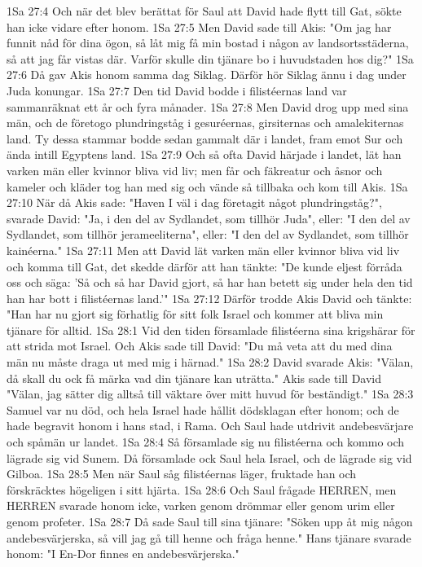 1Sa 27:4  Och när det blev berättat för Saul att David hade flytt till Gat, sökte han icke vidare efter honom.
1Sa 27:5  Men David sade till Akis: "Om jag har funnit nåd för dina ögon, så låt mig få min bostad i någon av landsortsstäderna, så att jag får vistas där. Varför skulle din tjänare bo i huvudstaden hos dig?"
1Sa 27:6  Då gav Akis honom samma dag Siklag. Därför hör Siklag ännu i dag under Juda konungar.
1Sa 27:7  Den tid David bodde i filistéernas land var sammanräknat ett år och fyra månader.
1Sa 27:8  Men David drog upp med sina män, och de företogo plundringståg i gesuréernas, girsiternas och amalekiternas land. Ty dessa stammar bodde sedan gammalt där i landet, fram emot Sur och ända intill Egyptens land.
1Sa 27:9  Och så ofta David härjade i landet, lät han varken män eller kvinnor bliva vid liv; men får och fäkreatur och åsnor och kameler och kläder tog han med sig och vände så tillbaka och kom till Akis.
1Sa 27:10  När då Akis sade: "Haven I väl i dag företagit något plundringståg?", svarade David: "Ja, i den del av Sydlandet, som tillhör Juda", eller: "I den del av Sydlandet, som tillhör jerameeliterna", eller: "I den del av Sydlandet, som tillhör kainéerna."
1Sa 27:11  Men att David lät varken män eller kvinnor bliva vid liv och komma till Gat, det skedde därför att han tänkte: "De kunde eljest förråda oss och säga: 'Så och så har David gjort, så har han betett sig under hela den tid han har bott i filistéernas land.'"
1Sa 27:12  Därför trodde Akis David och tänkte: "Han har nu gjort sig förhatlig för sitt folk Israel och kommer att bliva min tjänare för alltid.
1Sa 28:1  Vid den tiden församlade filistéerna sina krigshärar för att strida mot Israel. Och Akis sade till David: "Du må veta att du med dina män nu måste draga ut med mig i härnad."
1Sa 28:2  David svarade Akis: "Välan, då skall du ock få märka vad din tjänare kan uträtta." Akis sade till David "Välan, jag sätter dig alltså till väktare över mitt huvud för beständigt."
1Sa 28:3  Samuel var nu död, och hela Israel hade hållit dödsklagan efter honom; och de hade begravit honom i hans stad, i Rama. Och Saul hade utdrivit andebesvärjare och spåmän ur landet.
1Sa 28:4  Så församlade sig nu filistéerna och kommo och lägrade sig vid Sunem. Då församlade ock Saul hela Israel, och de lägrade sig vid Gilboa.
1Sa 28:5  Men när Saul såg filistéernas läger, fruktade han och förskräcktes högeligen i sitt hjärta.
1Sa 28:6  Och Saul frågade HERREN, men HERREN svarade honom icke, varken genom drömmar eller genom urim eller genom profeter.
1Sa 28:7  Då sade Saul till sina tjänare: "Söken upp åt mig någon andebesvärjerska, så vill jag gå till henne och fråga henne." Hans tjänare svarade honom: "I En-Dor finnes en andebesvärjerska."
